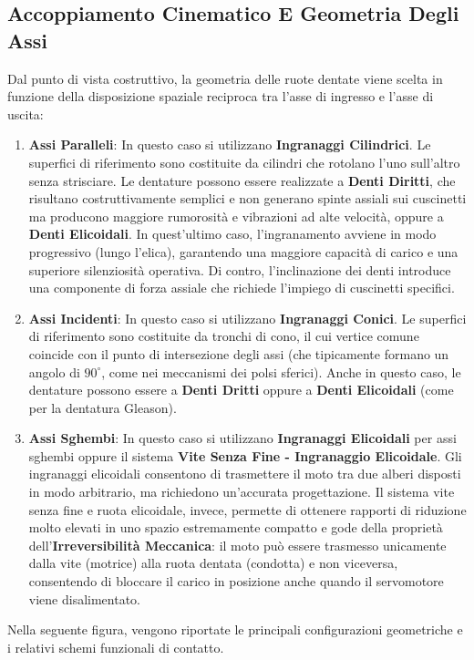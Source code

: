 ﻿\documentclass[11pt, a4paper]{article}
\begin{document}
\subsection{Accoppiamento Cinematico E Geometria Degli Assi}

Dal punto di vista costruttivo, la geometria delle ruote dentate viene scelta in funzione della disposizione spaziale reciproca tra l'asse di ingresso e l'asse di uscita:

\begin{enumerate}
    \item \textbf{Assi Paralleli}: In questo caso si utilizzano \textbf{Ingranaggi Cilindrici}. Le superfici di riferimento sono costituite da cilindri che rotolano l'uno sull'altro senza strisciare. Le dentature possono essere realizzate a \textbf{Denti Diritti}, che risultano costruttivamente semplici e non generano spinte assiali sui cuscinetti ma producono maggiore rumorosità e vibrazioni ad alte velocità, oppure a \textbf{Denti Elicoidali}. In quest'ultimo caso, l'ingranamento avviene in modo progressivo (lungo l'elica), garantendo una maggiore capacità di carico e una superiore silenziosità operativa. Di contro, l'inclinazione dei denti introduce una componente di forza assiale che richiede l'impiego di cuscinetti specifici.
    \item \textbf{Assi Incidenti}: In questo caso si utilizzano \textbf{Ingranaggi Conici}. Le superfici di riferimento sono costituite da tronchi di cono, il cui vertice comune coincide con il punto di intersezione degli assi (che tipicamente formano un angolo di $90^\circ$, come nei meccanismi dei polsi sferici). Anche in questo caso, le dentature possono essere a \textbf{Denti Dritti} oppure a \textbf{Denti Elicoidali} (come per la dentatura Gleason).
    \item \textbf{Assi Sghembi}: In questo caso si utilizzano \textbf{Ingranaggi Elicoidali} per assi sghembi oppure il sistema \textbf{Vite Senza Fine - Ingranaggio Elicoidale}. Gli ingranaggi elicoidali consentono di trasmettere il moto tra due alberi disposti in modo arbitrario, ma richiedono un'accurata progettazione. Il sistema vite senza fine e ruota elicoidale, invece, permette di ottenere rapporti di riduzione molto elevati in uno spazio estremamente compatto e gode della proprietà dell'\textbf{Irreversibilità Meccanica}: il moto può essere trasmesso unicamente dalla vite (motrice) alla ruota dentata (condotta) e non viceversa, consentendo di bloccare il carico in posizione anche quando il servomotore viene disalimentato.
\end{enumerate}
Nella seguente figura, vengono riportate le principali configurazioni geometriche e i relativi schemi funzionali di contatto.
\end{document}
